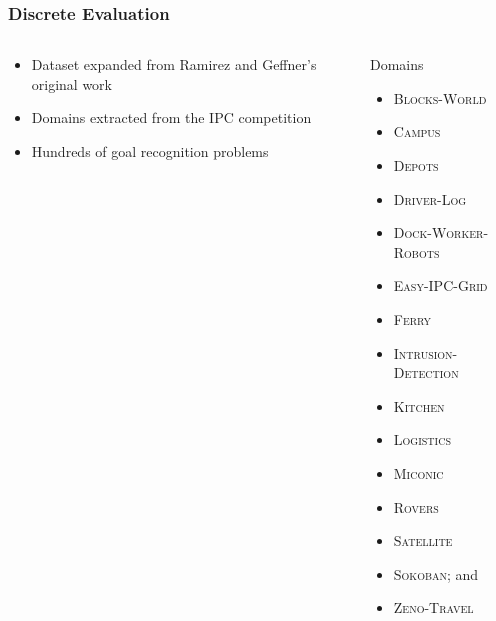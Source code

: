 \documentclass{beamer}
\def\masterclass{1}
\begin{document}
	\begin{frame}[c]\frametitle{Discrete Evaluation}
		\begin{columns}
			\begin{column}{0.7\textwidth}
				\begin{itemize}
					\item Dataset expanded from Ramirez and Geffner's original work
					\item Domains extracted from the IPC competition
					\item Hundreds of goal recognition problems
				\end{itemize}
			\end{column}
			\begin{column}{0.3\textwidth}
			Domains
			\begin{itemize}
				\tiny
				\item \textsc{Blocks-World}
				\item \textsc{Campus}
				\item \textsc{Depots}
				\item \textsc{Driver-Log}
				\item \textsc{Dock-Worker-Robots}
				\item \textsc{Easy-IPC-Grid}
				\item \textsc{Ferry}
				\item \textsc{Intrusion-Detection}
				\item \textsc{Kitchen}
				\item \textsc{Logistics}
				\item \textsc{Miconic}
				\item \textsc{Rovers}
				\item \textsc{Satellite}
				\item \textsc{Sokoban}; and
				\item \textsc{Zeno-Travel}
			\end{itemize}
			\end{column}
		\end{columns}
	\end{frame}
\end{document}
